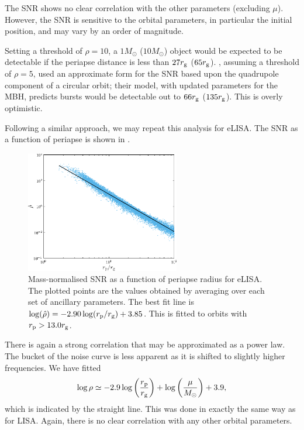 The SNR shows no clear correlation with the other parameters (excluding $\mu$). However, the SNR is sensitive to the orbital parameters, in particular the initial position, and may vary by an order of magnitude.

Setting a threshold of $\rho = 10$, a $1 M_\odot$ ($10 M_\odot$) object would be expected to be detectable if the periapse distance is less than $27 r_\mathrm{g}$ ($65 r_\mathrm{g}$). \citet{Hopman2007}, assuming a threshold of $\rho = 5$, used an approximate form for the SNR based upon the quadrupole component of a circular orbit; their model, with updated parameters for the MBH, predicts bursts would be detectable out to $66 r_\mathrm{g}$ ($135 r_\mathrm{g}$). This is overly optimistic.

Following a similar approach, we may repeat this analysis for eLISA. The SNR as a function of periapse is shown in .
\begin{figure}%
  \centering
  \includegraphics[width=0.6\textwidth]{./images/Fig_SNR_eLISA_NGO}
    \caption{Mass-normalised SNR as a function of periapse radius for eLISA. The plotted points are the values obtained by averaging over each set of ancillary parameters. The best fit line is $\log(\hat{\rho}) = -2.90\log(r_\mathrm{p}/r_\mathrm{g}) + 3.85$. This is fitted to orbits with $r_\mathrm{p} >  13.0 r_\mathrm{g}$.}
    \label{fig:SNR-eLISA}
\end{figure}
There is again a strong correlation that may be approximated as a power law. The bucket of the noise curve is less apparent as it is shifted to slightly higher frequencies. We have fitted
\begin{equation}
\log\rho \simeq -2.9\log\left(\dfrac{r_\mathrm{p}}{r_\mathrm{g}}\right) + \log\left(\dfrac{\mu}{M_\odot}\right) + 3.9,
\label{eq:SNR-power-law-eLISA}
\end{equation}
which is indicated by the straight line. This was done in exactly the same way as for LISA. Again, there is no clear correlation with any other orbital parameters.


